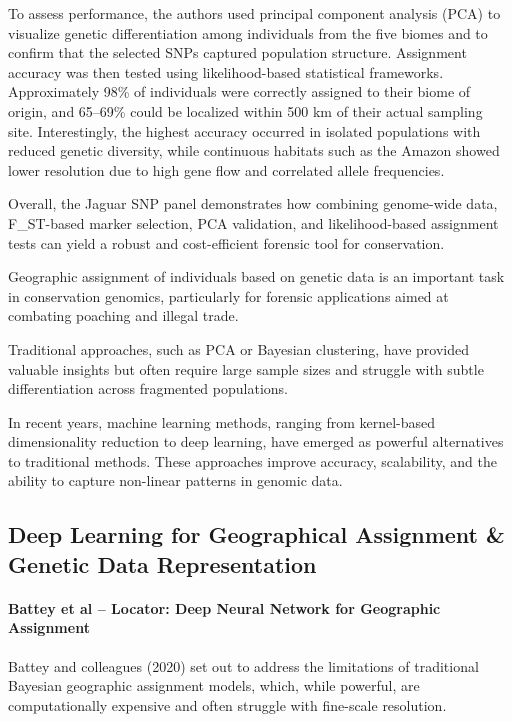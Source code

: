 \documentclass[twocolumn,10pt]{article}
\begin{document}
To assess performance, the authors used principal component analysis (PCA) to visualize genetic
differentiation among individuals from the five biomes and to confirm that the selected SNPs
captured population structure. Assignment accuracy was then tested using likelihood-based
statistical frameworks. Approximately 98\% of individuals were correctly assigned to their biome of
origin, and 65–69\% could be localized within 500 km of their actual sampling site. Interestingly,
the highest accuracy occurred in isolated populations with reduced genetic diversity, while
continuous habitats such as the Amazon showed lower resolution due to high gene flow and correlated
allele frequencies.

Overall, the Jaguar SNP panel demonstrates how combining genome-wide data, F\_ST-based marker
selection, PCA validation, and likelihood-based assignment tests can yield a robust and
cost-efficient forensic tool for conservation.

Geographic assignment of individuals based on genetic data is an important task in conservation
genomics, particularly for forensic applications aimed at combating poaching and illegal trade.

Traditional approaches, such as PCA or Bayesian clustering, have provided valuable insights but
often require large sample sizes and struggle with subtle differentiation across fragmented
populations.

In recent years, machine learning methods, ranging from kernel-based dimensionality reduction to
deep learning, have emerged as powerful alternatives to traditional methods. These approaches
improve accuracy, scalability, and the ability to capture non-linear patterns in genomic data.

\subsection*{Deep Learning for Geographical Assignment \& Genetic Data Representation}

\paragraph{Battey et al – Locator: Deep Neural Network for Geographic Assignment}

Battey and colleagues (2020) \citep{battey2020predicting} set out to address the limitations of
traditional Bayesian geographic assignment models, which, while powerful, are computationally
expensive and often struggle with fine-scale resolution.
\end{document}
